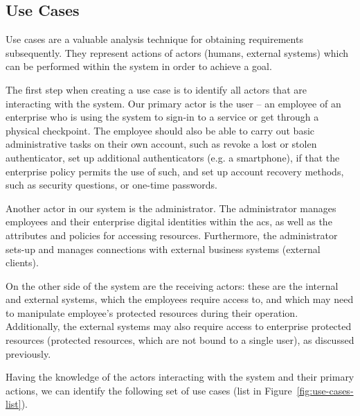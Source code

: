 \subsection{Use Cases} \label{sec:analysis-usecases}
Use cases are a valuable analysis technique for obtaining requirements subsequently. They represent actions of actors (humans, external systems) which can be performed within the system in order to achieve a goal. 


The first step when creating a use case is to identify all actors that are interacting with the system. Our primary actor is the user -- an employee of an enterprise who is using the system to sign-in to a service or get through a physical checkpoint. The employee should also be able to carry out basic administrative tasks on their own account, such as revoke a lost or stolen authenticator, set up additional authenticators (e.g. a smartphone), if that the enterprise policy permits the use of such, and set up account recovery methods, such as security questions, or one-time passwords.

Another actor in our system is the administrator. The administrator manages employees and their enterprise digital identities within the \acrshort{acs}, as well as the attributes and policies for accessing resources. Furthermore, the administrator sets-up and manages connections with external business systems (external clients). 

On the other side of the system are the receiving actors: these are the internal and external systems, which the employees require access to, and which may need to manipulate employee's protected resources during their operation. Additionally, the external systems may also require access to enterprise protected resources (protected resources, which are not bound to a single user), as discussed previously\footnotemark.
% 

Having the knowledge of the actors interacting with the system and their primary actions, we can identify the following set of use cases (list in Figure~\ref{fig:use-cases-list}). 

